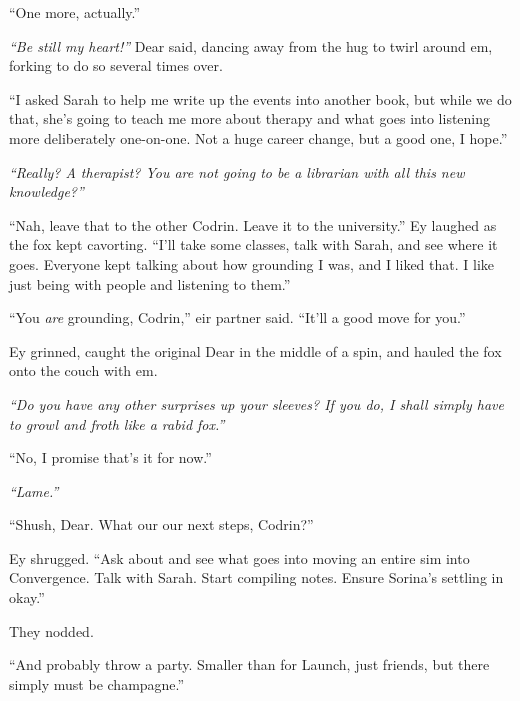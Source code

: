 ``One more, actually.''

\emph{``Be still my heart!''} Dear said, dancing away from the hug to twirl around em, forking to do so several times over.

``I asked Sarah to help me write up the events into another book, but while we do that, she's going to teach me more about therapy and what goes into listening more deliberately one-on-one. Not a huge career change, but a good one, I hope.''

\emph{``Really? A therapist? You are not going to be a librarian with all this new knowledge?''}

``Nah, leave that to the other Codrin. Leave it to the university.'' Ey laughed as the fox kept cavorting. ``I'll take some classes, talk with Sarah, and see where it goes. Everyone kept talking about how grounding I was, and I liked that. I like just being with people and listening to them.''

``You \emph{are} grounding, Codrin,'' eir partner said. ``It'll a good move for you.''

Ey grinned, caught the original Dear in the middle of a spin, and hauled the fox onto the couch with em.

\emph{``Do you have any other surprises up your sleeves? If you do, I shall simply have to growl and froth like a rabid fox.''}

``No, I promise that's it for now.''

\emph{``Lame.''}

``Shush, Dear. What our our next steps, Codrin?''

Ey shrugged. ``Ask about and see what goes into moving an entire sim into Convergence. Talk with Sarah. Start compiling notes. Ensure Sorina's settling in okay.''

They nodded.

``And probably throw a party. Smaller than for Launch, just friends, but there simply must be champagne.''
